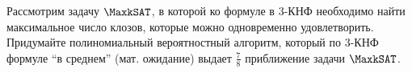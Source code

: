 Рассмотрим задачу $\MaxkSAT$, в которой ко формуле в $3$-КНФ необходимо найти максимальное число клозов, которые можно
одновременно удовлетворить. Придумайте полиномиальный вероятностный алгоритм, который по $3$-КНФ формуле ``в среднем''
(мат. ожидание) выдает $\frac{7}{8}$ приближение задачи $\MaxkSAT$.